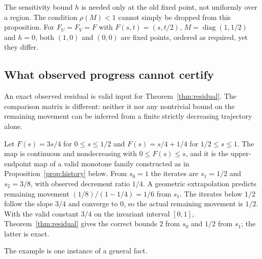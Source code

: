 The sensitivity bound $h$ is needed only at the old fixed point, not
uniformly over a region. The condition $\rho(M)<1$ cannot simply be
dropped from this proposition. For $F_U=F_V=F$ with $F(s,t)=(s,t/2)$,
$M=\operatorname{diag}(1,1/2)$ and $h=0$, both $(1,0)$ and $(0,0)$ are
fixed points, ordered as required, yet they differ.

\subsection{What observed progress cannot certify}\label{sec:residual-history}

An exact observed residual is valid input for Theorem~\ref{thm:residual}.
The comparison matrix is different: neither it nor any nontrivial bound
on the remaining movement can be inferred from a finite strictly
decreasing trajectory alone.

\begin{example}\label{ex:ratio}
Let $F(s)=3s/4$ for $0\le s\le1/2$ and $F(s)=s/4+1/4$ for $1/2\le s\le1$.
The map is continuous and nondecreasing with $0\le F(s)\le s$, and it
is the upper-endpoint map of a valid monotone family constructed as in
Proposition~\ref{prop:history} below. From $s_0=1$ the iterates are
$s_1=1/2$ and $s_2=3/8$, with observed decrement ratio $1/4$. A geometric
extrapolation predicts remaining movement $(1/8)/(1-1/4)=1/6$ from $s_1$.
The iterates below $1/2$ follow the slope $3/4$ and converge to $0$, so
the actual remaining movement is $1/2$. With the valid constant $3/4$ on
the invariant interval $[0,1]$, Theorem~\ref{thm:residual} gives the
correct bounds $2$ from $s_0$ and $1/2$ from $s_1$; the latter is exact.
\end{example}

The example is one instance of a general fact.

